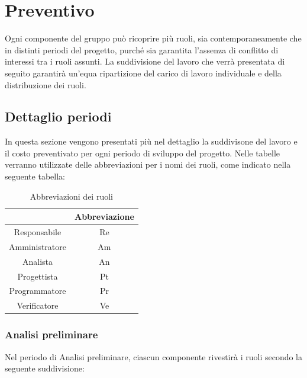 \section{Preventivo} \label{section:preventivo}
Ogni componente del gruppo può ricoprire più ruoli, sia contemporaneamente che in distinti periodi del progetto, purché sia garantita l'assenza di conflitto di interessi tra i ruoli assunti.
La suddivisione del lavoro che verrà presentata di seguito garantirà un'equa ripartizione del carico di lavoro individuale e della distribuzione dei ruoli.
\subsection{Dettaglio periodi} \label{subsection:preventivo_dettaglio_periodi}
In questa sezione vengono presentati più nel dettaglio la suddivisone del lavoro e il costo preventivato per ogni periodo di sviluppo del progetto.
Nelle tabelle verranno utilizzate delle abbreviazioni per i nomi dei ruoli, come indicato nella seguente tabella:

\begin{table}[H]
  \centering
  \renewcommand{\arraystretch}{1.8}
  \begin{tabular}{c|c}
    \rowcolor[HTML]{125E28}
    \multicolumn{1}{c}{\color[HTML]{FFFFFF}\textbf{Ruolo}}
                   & \multicolumn{1}{c}{\color[HTML]{FFFFFF}\textbf{Abbreviazione}} \\
    \hline
    Responsabile   & Re                                                             \\
    Amministratore & Am                                                             \\
    Analista       & An                                                             \\
    Progettista    & Pt                                                             \\
    Programmatore  & Pr                                                             \\
    Verificatore   & Ve
  \end{tabular}
  \caption{Abbreviazioni dei ruoli}
\end{table}

\pagebreak
\subsubsection{Analisi preliminare}
Nel periodo di Analisi preliminare, ciascun componente rivestirà i ruoli secondo la seguente suddivisione:

